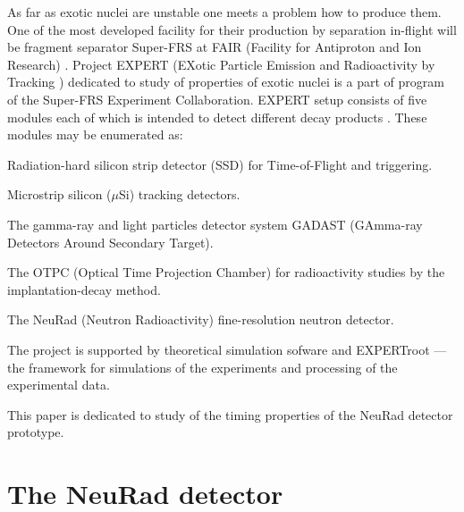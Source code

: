 \documentclass{webofc}
\begin{document}
As far as exotic nuclei are unstable one meets a problem how to produce them.
One of the most developed facility for their production by separation in-flight will be fragment separator Super-FRS at FAIR (Facility for Antiproton and Ion Research) \cite{diplom}. Project EXPERT (EXotic Particle Emission and Radioactivity by Tracking \cite{IMexpert}) dedicated to study of properties of exotic nuclei is a part of program of the Super-FRS Experiment Collaboration. EXPERT setup consists of five modules each of which is intended to detect different decay products \cite{tdr}.
These modules may be enumerated as:
\begin{inparaenum}[(i)]
	\item Radiation-hard silicon strip detector (SSD) for Time-of-Flight and triggering.
	\item Microstrip silicon ($\mu$Si) tracking detectors.
	\item The gamma-ray and light particles detector system GADAST (GAmma-ray Detectors Around Secondary Target).
	\item The OTPC (Optical Time Projection Chamber) for radioactivity studies by the implantation-decay method.
	\item The NeuRad (Neutron Radioactivity) fine-resolution neutron detector.
\end{inparaenum}

The project is supported by theoretical simulation sofware and EXPERTroot \cite{er} --- the framework for simulations of the experiments and processing of the experimental data. 

This paper is dedicated to study of the timing properties of the NeuRad detector prototype.

\section{The NeuRad detector}
\end{document}
